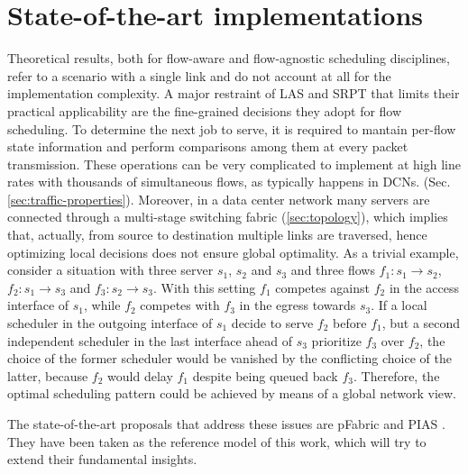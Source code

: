 \section{State-of-the-art implementations}
Theoretical results, both for flow-aware and flow-agnostic scheduling disciplines, refer to a scenario with a single link and do not account at all for the implementation complexity. A major restraint of LAS and SRPT that limits their practical applicability are the fine-grained decisions they adopt for flow scheduling. To determine the next job to serve, it is required to mantain per-flow state information and perform comparisons among them at every packet transmission. These operations can be very complicated to implement at high line rates with thousands of simultaneous flows, as typically happens in DCNs. (Sec. \ref{sec:traffic-properties}). Moreover, in a data center network many servers are connected through a multi-stage switching fabric (\ref{sec:topology}), which implies that, actually, from source to destination multiple links are traversed, hence optimizing local decisions does not ensure global optimality. As a trivial example, consider a situation with three server $s_1$, $s_2$ and $s_3$ and three flows $f_1:s_1 \longrightarrow s_2$, $f_2:s_1 \longrightarrow s_3$ and $f_3:s_2 \longrightarrow s_3$. With this setting $f_1$ competes against $f_2$ in the access interface of $s_1$, while $f_2$ competes with $f_3$ in the egress towards $s_3$. If a local scheduler in the outgoing interface of $s_1$ decide to serve $f_2$ before $f_1$, but a second independent scheduler in the last interface ahead of $s_3$ prioritize $f_3$ over $f_2$, the choice of the former scheduler would be vanished by the conflicting choice of the latter, because $f_2$ would delay $f_1$ despite being queued back $f_3$. Therefore, the optimal scheduling pattern could be achieved by means of a global network view. 

The state-of-the-art proposals that address these issues are pFabric \cite{pFabric} and PIAS \cite{pias}. They have been taken as the reference model of this work, which will try to extend their fundamental insights.  

